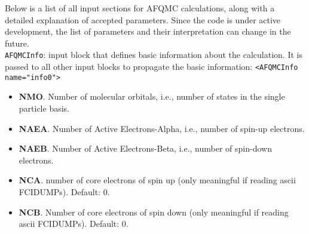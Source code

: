 Below is a list of all input sections for AFQMC calculations, along with a detailed explanation of accepted parameters. Since the code is under active development, the list of parameters and their interpretation can change in the future.\\

\texttt{AFQMCInfo}: input block that defines basic information about the calculation. It is passed to all other input blocks to propagate the basic information:
\texttt{<AFQMCInfo name="info0">}
\begin{itemize}
\item \textbf{NMO}. Number of molecular orbitals, i.e., number of states in the single particle basis. 
\item \textbf{NAEA}. Number of Active Electrons-Alpha, i.e., number of spin-up electrons.
\item \textbf{NAEB}. Number of Active Electrons-Beta, i.e., number of spin-down electrons.
\item \textbf{NCA}. number of core electrons of spin up (only meaningful if reading ascii FCIDUMPs). Default: 0.
\item \textbf{NCB}. Number of core electrons of spin down (only meaningful if reading ascii FCIDUMPs). Default: 0.\\
\end{itemize}

